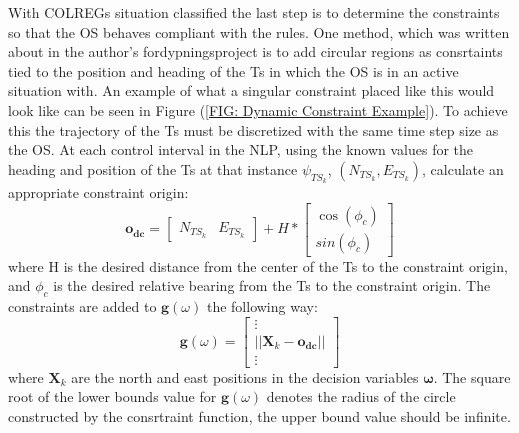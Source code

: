 With \gls{COLREGs} situation classified the last step is to determine the constraints so that the \gls{OS} behaves compliant with the rules.
One method, which was written about in the author's fordypningsproject is to add circular regions as consrtaints tied to the position and heading
of the \gls{Ts} in which the \gls{OS} is in an active situation with. An example of what a singular constraint placed like this would look like
can be seen in Figure (\ref{FIG: Dynamic Constraint Example}). To achieve this the trajectory of the \gls{Ts} must be discretized with the same
time step size as the \gls{OS}. At each control interval in the \gls{NLP}, using the known values for the heading 
and position of the \gls{Ts} at that instance $\psi_{TS_{k}}$, $(N_{TS_{k}}, E_{TS_{k}})$, calculate an appropriate constraint origin:
\begin{equation}
    \mathbf{o_{dc}} = \begin{bmatrix}
        N_{TS_{k}} & E_{TS_{k}}
                    \end{bmatrix} + H * \begin{bmatrix}
                                        \cos(\phi_c) \\
                                        sin(\phi_c)
                                        \end{bmatrix}
\end{equation}
where H is the desired distance from the center of the \gls{Ts} to the constraint origin, and $\phi_c$ is the desired relative
bearing from the \gls{Ts} to the constraint origin. The constraints are added to $\textbf{g}(\omega)$ the following way:
\begin{equation}
    \textbf{g}(\omega) = \begin{bmatrix}
        \vdots \\
        ||\textbf{X}_k - \mathbf{o_{dc}}||\\
        \vdots
    \end{bmatrix}
\end{equation}
where $\textbf{X}_k$ are the north and east positions in the decision variables $\bm{\omega}$. The square root of the lower bounds value
for $\textbf{g}(\omega)$ denotes the radius of the circle constructed by the consrtraint function, the upper bound value should be infinite.

